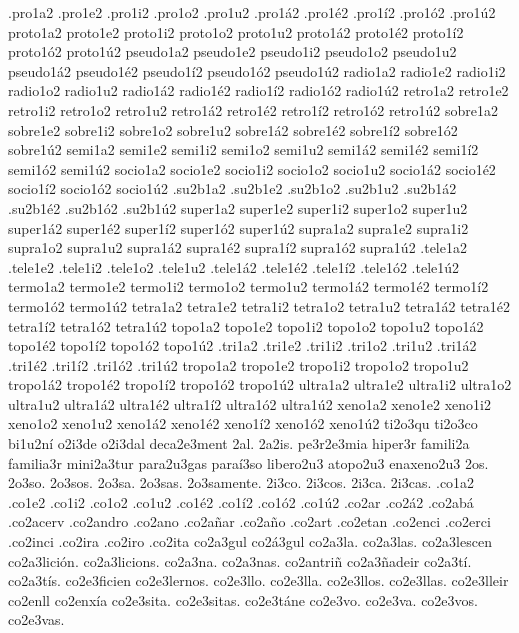 {.pro1a2 .pro1e2 .pro1i2 .pro1o2 .pro1u2 .pro1á2 .pro1é2 .pro1í2 .pro1ó2 .pro1ú2 
proto1a2 proto1e2 proto1i2 proto1o2 proto1u2 proto1á2 proto1é2 proto1í2 proto1ó2 proto1ú2 
pseudo1a2 pseudo1e2 pseudo1i2 pseudo1o2 pseudo1u2 pseudo1á2 pseudo1é2 pseudo1í2 pseudo1ó2 pseudo1ú2 
radio1a2 radio1e2 radio1i2 radio1o2 radio1u2 radio1á2 radio1é2 radio1í2 radio1ó2 radio1ú2 
retro1a2 retro1e2 retro1i2 retro1o2 retro1u2 retro1á2 retro1é2 retro1í2 retro1ó2 retro1ú2 
sobre1a2 sobre1e2 sobre1i2 sobre1o2 sobre1u2 sobre1á2 sobre1é2 sobre1í2 sobre1ó2 sobre1ú2 
semi1a2 semi1e2 semi1i2 semi1o2 semi1u2 semi1á2 semi1é2 semi1í2 semi1ó2 semi1ú2 
socio1a2 socio1e2 socio1i2 socio1o2 socio1u2 socio1á2 socio1é2 socio1í2 socio1ó2 socio1ú2 
.su2b1a2 .su2b1e2          .su2b1o2 .su2b1u2 .su2b1á2 .su2b1é2          .su2b1ó2 .su2b1ú2 
super1a2 super1e2 super1i2 super1o2 super1u2 super1á2 super1é2 super1í2 super1ó2 super1ú2 
supra1a2 supra1e2 supra1i2 supra1o2 supra1u2 supra1á2 supra1é2 supra1í2 supra1ó2 supra1ú2 
.tele1a2 .tele1e2 .tele1i2 .tele1o2 .tele1u2 .tele1á2 .tele1é2 .tele1í2 .tele1ó2 .tele1ú2 
termo1a2 termo1e2 termo1i2 termo1o2 termo1u2 termo1á2 termo1é2 termo1í2 termo1ó2 termo1ú2 
tetra1a2 tetra1e2 tetra1i2 tetra1o2 tetra1u2 tetra1á2 tetra1é2 tetra1í2 tetra1ó2 tetra1ú2 
topo1a2 topo1e2 topo1i2 topo1o2 topo1u2 topo1á2 topo1é2 topo1í2 topo1ó2 topo1ú2 
.tri1a2 .tri1e2 .tri1i2 .tri1o2 .tri1u2 .tri1á2 .tri1é2 .tri1í2 .tri1ó2 .tri1ú2 
tropo1a2 tropo1e2 tropo1i2 tropo1o2 tropo1u2 tropo1á2 tropo1é2 tropo1í2 tropo1ó2 tropo1ú2 
ultra1a2 ultra1e2 ultra1i2 ultra1o2 ultra1u2 ultra1á2 ultra1é2 ultra1í2 ultra1ó2 ultra1ú2 
xeno1a2 xeno1e2 xeno1i2 xeno1o2 xeno1u2 xeno1á2 xeno1é2 xeno1í2 xeno1ó2 xeno1ú2 
%
ti2o3qu ti2o3co bi1u2ní o2i3de o2i3dal deca2e3ment 2al. 2a2is. pe3r2e3mia hiper3r 
famili2a familia3r mini2a3tur para2u3gas paraí3so 
%
%
libero2u3 
atopo2u3 
enaxeno2u3 
%
2os. 2o3so. 2o3sos. 2o3sa. 2o3sas. 2o3samente. 
2i3co. 2i3cos. 2i3ca. 2i3cas. 
%
%
.co1a2 .co1e2 .co1i2 .co1o2 .co1u2        .co1é2 .co1í2 .co1ó2 .co1ú2 
%
%
.co2ar 
.co2á2 
.co2abá 
.co2acerv 
.co2andro 
.co2ano 
.co2añar 
.co2año 
.co2art 
.co2etan 
.co2enci 
.co2erci 
.co2inci 
.co2ira 
.co2iro 
.co2ita 
%
co2a3gul 
co2á3gul 
co2a3la. 
co2a3las. 
co2a3lescen 
co2a3lición. 
co2a3licions. 
co2a3na. 
co2a3nas. 
co2antriñ 
co2a3ñadeir 
co2a3tí. 
co2a3tís. 
co2e3ficien 
co2e3lernos. 
co2e3llo. 
co2e3lla. 
co2e3llos. 
co2e3llas. 
co2e3lleir 
co2enll 
co2enxía 
co2e3sita. 
co2e3sitas. 
co2e3táne 
co2e3vo. 
co2e3va. 
co2e3vos. 
co2e3vas. 
}

